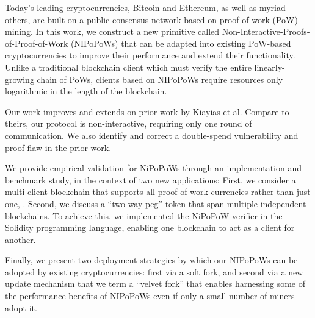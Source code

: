 Today's leading cryptocurrencies, Bitcoin and Ethereum, as well as myriad others, are built on a public consensus network based on proof-of-work (PoW) mining. In this work, we construct a new primitive called Non-Interactive-Proofs-of-Proof-of-Work (NIPoPoWs) that can be adapted into existing PoW-based cryptocurrencies to improve their performance and extend their functionality.
Unlike a traditional blockchain client
which must verify the entire linearly-growing chain of PoWs, clients based on
NIPoPoWs require resources only logarithmic in the length of the blockchain.

Our work improves and extends on prior work by Kiayias et al. Compare to theirs, our protocol is non-interactive, requiring only one round of communication. We also identify and correct a double-spend vulnerability and proof flaw in the prior work. %

We provide empirical validation for NiPoPoWs through an implementation and benchmark study, in the context of two new applications:
First, we consider a multi-client blockchain that supports all proof-of-work currencies rather than just one, .
Second, we discuss a ``two-way-peg'' token that span multiple independent blockchains. To achieve this, we implemented the NiPoPoW verifier in the Solidity programming language, enabling one blockchain to act as a client for another.

 Finally, we present two deployment strategies by which our NIPoPoWs can be adopted by existing cryptocurrencies: first via a soft fork, and second via a new update mechanism that we
term a ``velvet fork'' that enables harnessing some of the performance benefits
of NIPoPoWs even if only a small number of miners adopt it.
